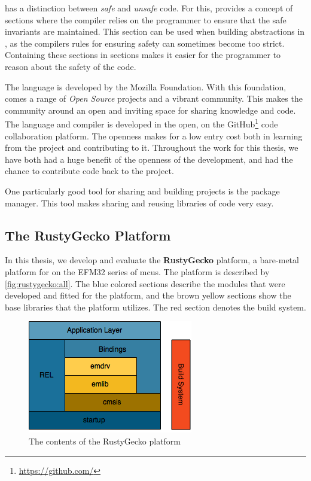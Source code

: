 {\rust} has a distinction between \emph{safe} and \emph{unsafe} code.
For this, {\rust} provides a concept of {\unsafe} sections where the compiler relies on the programmer to ensure that the safe invariants are maintained.
This section can be used when building abstractions in {\rust}, as the compilers rules for ensuring safety can sometimes become too strict.
Containing these sections in {\unsafe} sections makes it easier for the programmer to reason about the safety of the code.

The {\rust} language is developed by the Mozilla Foundation.
With this foundation, comes a range of \emph{Open Source} projects and a vibrant community.
This makes the community around {\rust} an open and inviting space for sharing knowledge and code.
The {\rust} language and compiler is developed in the open, on the GitHub\footnote{\url{https://github.com/}} code collaboration platform.
The openness makes for a low entry cost both in learning from the project and contributing to it.
Throughout the work for this thesis, we have both had a huge benefit of the openness of the development, and had the chance to contribute code back to the {\rust} project.

One particularly good tool for sharing and building {\rust} projects is the {\cargo} package manager.
This tool makes sharing and reusing libraries of code very easy.

\subsection{The RustyGecko Platform}

In this thesis, we develop and evaluate the \textbf{RustyGecko} platform, a bare-metal platform for {\rust} on the EFM32 series of \glspl{mcu}.
The platform is described by \autoref{fig:rustygecko:all}.
The blue colored sections describe the {\rust} modules that were developed and fitted for the platform, and the brown yellow sections show the base {\C} libraries that the platform utilizes.
The red section denotes the build system.

\begin{figure}[H]
  \begin{center}
    \includegraphics{figures/RustyGecko-all.png}
  \end{center}
  \caption{The contents of the RustyGecko platform}
  \label{fig:rustygecko:all}
\end{figure}

